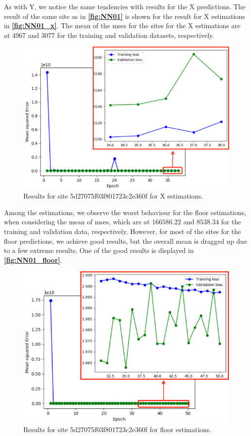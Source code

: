 As with Y, we notice the same tendencies with results for the X predictions. The result of the same site as in \textbf{\autoref{fig:NN01}} is shown for the result for X estimations in \textbf{\autoref{fig:NN01_x}}. The mean of the \gls{mse}s for the sites for the X estimations are at 4967 and 3077 for the training and validation datasets, respectively.

\begin{figure}[H]
    \centering
    \includegraphics[scale=0.4]{Images/Experiments/NN/1.initial/5d27075f03f801723c2e360f_x.png}
    \caption{Results for site 5d27075f03f801723c2e360f for X estimations.}
    \label{fig:NN01_x}
\end{figure}

Among the estimations, we observe the worst behaviour for the floor estimations, when considering the mean of \gls{mse}s, which are at $166586.22$ and $8538.34$ for the training and validation data, respectively. However, for most of the sites for the floor predictions, we achieve good results, but the overall mean is dragged up due to a few extreme results. One of the good results is displayed in \textbf{\autoref{fig:NN01_floor}}.

\begin{figure}[H]
    \centering
    \includegraphics[scale=0.4]{Images/Experiments/NN/1.initial/5d27075f03f801723c2e360f_floor.png}
    \caption{Results for site 5d27075f03f801723c2e360f for floor estimations.}
    \label{fig:NN01_floor}
\end{figure}

